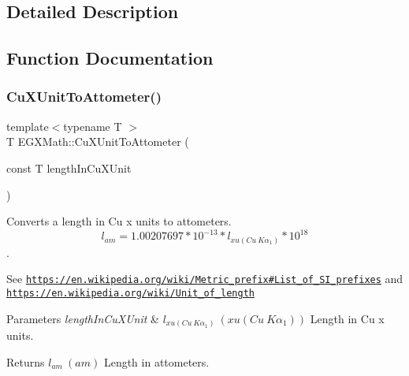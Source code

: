 \subsection{Detailed Description}


\subsection{Function Documentation}
\mbox{\label{group___e_g_x_math-_conversions-_length_conversions-_non-_s_i-_cu_x_unit-_s_i_gac5f865a6c60f1712b7f7cfb29d52407b}} 
\subsubsection{\texorpdfstring{Cu\+X\+Unit\+To\+Attometer()}{CuXUnitToAttometer()}}
{\footnotesize\ttfamily template$<$typename T $>$ \\
T E\+G\+X\+Math\+::\+Cu\+X\+Unit\+To\+Attometer (\begin{DoxyParamCaption}\item[{const T}]{length\+In\+Cu\+X\+Unit }\end{DoxyParamCaption})}



Converts a length in Cu x units to attometers. \[ l_{am}=1.00207697*10^{-13} * l_{xu(Cu\ K\alpha_1)} * 10^{18} \]. 

See \href{https://en.wikipedia.org/wiki/Metric_prefix#List_of_SI_prefixes}{\tt https\+://en.\+wikipedia.\+org/wiki/\+Metric\+\_\+prefix\#\+List\+\_\+of\+\_\+\+S\+I\+\_\+prefixes} and \href{https://en.wikipedia.org/wiki/Unit_of_length}{\tt https\+://en.\+wikipedia.\+org/wiki/\+Unit\+\_\+of\+\_\+length} 
\begin{DoxyParams}{Parameters}
{\em length\+In\+Cu\+X\+Unit} & $ l_{xu(Cu\ K\alpha_1)}\ (xu(Cu\ K\alpha_1))$ Length in Cu x units. \\
\hline
\end{DoxyParams}
\begin{DoxyReturn}{Returns}
$ l_{am}\ (am)$ Length in attometers. 
\end{DoxyReturn}
\mbox{\label{group___e_g_x_math-_conversions-_length_conversions-_non-_s_i-_cu_x_unit-_s_i_gac30da492d2b67c1d9c3587bdcf84e370}} 
